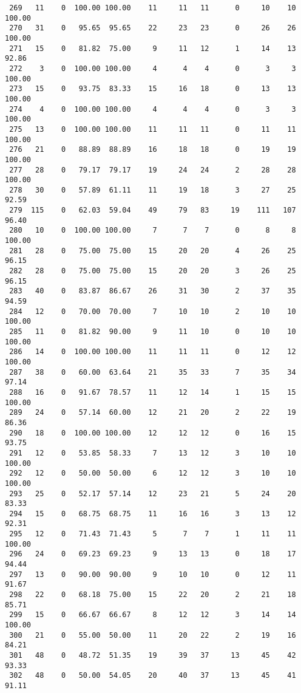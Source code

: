 \begin{verbatim}
 269   11    0  100.00 100.00    11     11   11      0     10    10   100.00
 270   31    0   95.65  95.65    22     23   23      0     26    26   100.00
 271   15    0   81.82  75.00     9     11   12      1     14    13    92.86
 272    3    0  100.00 100.00     4      4    4      0      3     3   100.00
 273   15    0   93.75  83.33    15     16   18      0     13    13   100.00
 274    4    0  100.00 100.00     4      4    4      0      3     3   100.00
 275   13    0  100.00 100.00    11     11   11      0     11    11   100.00
 276   21    0   88.89  88.89    16     18   18      0     19    19   100.00
 277   28    0   79.17  79.17    19     24   24      2     28    28   100.00
 278   30    0   57.89  61.11    11     19   18      3     27    25    92.59
 279  115    0   62.03  59.04    49     79   83     19    111   107    96.40
 280   10    0  100.00 100.00     7      7    7      0      8     8   100.00
 281   28    0   75.00  75.00    15     20   20      4     26    25    96.15
 282   28    0   75.00  75.00    15     20   20      3     26    25    96.15
 283   40    0   83.87  86.67    26     31   30      2     37    35    94.59
 284   12    0   70.00  70.00     7     10   10      2     10    10   100.00
 285   11    0   81.82  90.00     9     11   10      0     10    10   100.00
 286   14    0  100.00 100.00    11     11   11      0     12    12   100.00
 287   38    0   60.00  63.64    21     35   33      7     35    34    97.14
 288   16    0   91.67  78.57    11     12   14      1     15    15   100.00
 289   24    0   57.14  60.00    12     21   20      2     22    19    86.36
 290   18    0  100.00 100.00    12     12   12      0     16    15    93.75
 291   12    0   53.85  58.33     7     13   12      3     10    10   100.00
 292   12    0   50.00  50.00     6     12   12      3     10    10   100.00
 293   25    0   52.17  57.14    12     23   21      5     24    20    83.33
 294   15    0   68.75  68.75    11     16   16      3     13    12    92.31
 295   12    0   71.43  71.43     5      7    7      1     11    11   100.00
 296   24    0   69.23  69.23     9     13   13      0     18    17    94.44
 297   13    0   90.00  90.00     9     10   10      0     12    11    91.67
 298   22    0   68.18  75.00    15     22   20      2     21    18    85.71
 299   15    0   66.67  66.67     8     12   12      3     14    14   100.00
 300   21    0   55.00  50.00    11     20   22      2     19    16    84.21
 301   48    0   48.72  51.35    19     39   37     13     45    42    93.33
 302   48    0   50.00  54.05    20     40   37     13     45    41    91.11

\end{verbatim}
